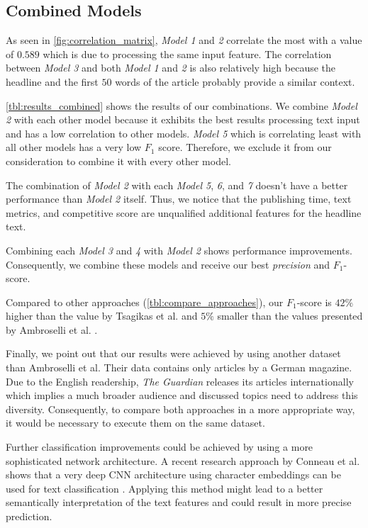 \subsection{Combined Models}
As seen in \autoref{fig:correlation_matrix}, \textit{Model 1} and \textit{2} correlate the most with a value of $0.589$ which is due to processing the same input feature.
The correlation between \textit{Model 3} and both \textit{Model 1} and \textit{2} is also relatively high because the headline and the first $50$ words of the article probably provide a similar context.

\autoref{tbl:results_combined} shows the results of our combinations. We combine \textit{Model 2} with each other model because it exhibits the best results processing text input and has a low correlation to other models.
\textit{Model 5} which is correlating least with all other models has a very low $F_1$ score. Therefore, we exclude it from our consideration to combine it with every other model.



The combination of \textit{Model 2} with each \textit{Model 5}, \textit{6}, and \textit{7} doesn't have a better performance than \textit{Model 2} itself. 
Thus, we notice that the publishing time, text metrics, and competitive score are unqualified additional features for the headline text.

Combining each \textit{Model 3} and \textit{4} with \textit{Model 2} shows performance improvements.
Consequently, we combine these models and receive our best \textit{precision} and $F_1$-score.

Compared to other approaches (\autoref{tbl:compare_approaches}), our $F_1$-score is $42\%$ higher than the  value by Tsagikas et al. and $5\%$ smaller than the values presented by Ambroselli et al. \cite{ambroselli2018prediction}.



Finally, we point out that our results were achieved by using another dataset than Ambroselli et al. 
Their data contains only articles by a German magazine. 
Due to the English readership, \textit{The Guardian} releases its articles internationally which implies a much broader audience and discussed topics need to address this diversity. Consequently, to compare both approaches in a more appropriate way, it would be necessary to execute them on the same dataset.

Further classification improvements could be achieved by using a more sophisticated network architecture. A recent research approach by Conneau et al. shows that a very deep CNN architecture using character embeddings can be used for text classification \cite{conneau2016very}. Applying this method might lead to a better semantically interpretation of the text features and could result in more precise prediction.